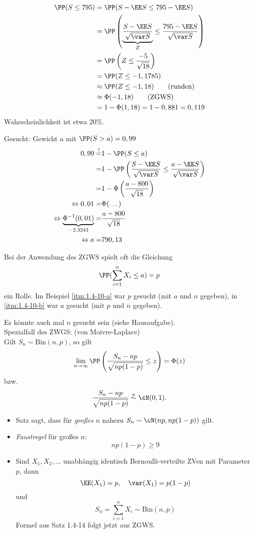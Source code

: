 \begin{anumerate}
\item
\begin{align*}
\PP(S \leq 795) &= \PP( S - \EE S \leq 795 - \EE S) \\
&= \PP\left(\underbrace{\frac{S - \EE S}{\sqrt{\var S}}}_{Z}\leq \frac{795-\EE S}{\sqrt{ \var S}}\right)\\
&= \PP\left( Z \leq \frac{-5}{\sqrt{18}}\right)\\
&= \PP(Z \leq - 1,1785)\\
&\approx \PP(Z \leq - 1,18) \qquad \text{(runden)}\\
&\approx \Phi(-1,18) \qquad \text{(ZGWS)}\\
&= 1- \Phi(1,18) = 1-0,881 = 0,119
\end{align*}
Wahrscheinlichkeit ist etwa $20\%$.
\item Gesucht: Gewicht $a$ mit $\PP(S > a) = 0,99$
\begin{align*}
0,99 \overset{!}{=}& 1- \PP(S \leq a)\\
=& 1- \PP\left( \frac{S-\EE S}{\sqrt{\var S}} \leq \frac{a-\EE S}{\sqrt{\var S}}\right)\\
=& 1- \Phi\left(\frac{a-800}{\sqrt{18}}\right)\\
\Leftrightarrow 0,01 =& \Phi (\dots)\\
\Leftrightarrow \underbrace{\Phi^{-1} (0,01)}_{-2,3243} =& \frac{a-800}{\sqrt{18}}\\
\Leftrightarrow a =& 790,13
\end{align*}
\end{anumerate}

Bei der Anwendung des ZGWS spielt oft die Gleichung
$$\PP(\sum_{i=1}^n X_i \leq a) = p$$
ein Rolle. Im Beispiel \ref{itm:1.4-10-a} war $p$ gesucht (mit $a$ und $n$ gegeben), in \ref{itm:1.4-10-b} war $a$ gesucht (mit $p$ und $n$ gegeben). 

Es könnte auch mal $n$ gesucht sein (siehe Hausaufgabe).\\
Spezialfall des ZWGS:
 (von Moivre-Laplace)\\
Gilt $S_n \sim \mathrm{Bin}(n,p)$, so gilt 
$$\lim_{n\to \infty} \PP\left( \frac{S_n - np}{\sqrt{np (1-p)}} \leq z \right) = \Phi(z)$$
bzw.
$$\frac{S_n - np}{\sqrt{np (1-p)}} \overset{a}{\sim} \cN(0,1)\text{.}$$

\begin{itemize}
\item Satz sagt, dass für \emph{großes} $n$ nahezu $S_n \sim \cN(np, np(1-p))$ gilt.
\item \emph{Faustregel} für großes $n$:
$$np(1-p) \geq 9$$
\item Sind $X_1, X_2, \ldots$ unabhängig identisch Bernoulli-verteilte ZVen mit Parameter $p$, dann
$$\EE(X_1)=p, \quad \var (X_1) = p (1-p)$$
und
$$S_n = \sum_{i=1}^n X_i \sim \mathrm{Bin}(n,p)$$
Formel aus Satz 1.4-14 folgt jetzt aus ZGWS.
\end{itemize}

